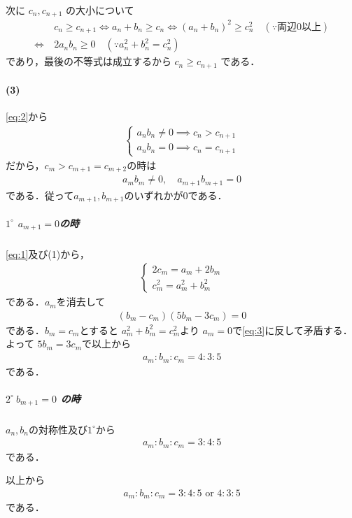 \documentclass[../../main.tex]{subfiles}
\begin{document}
次に $c_{n}, c_{n+1}$ の大小について
\begin{align}
  & c_n \ge c_{n+1}
  \Leftrightarrow
  a_n+b_n \ge c_n
  \Leftrightarrow
  (a_n+b_n)^2 \ge c_n^2 \quad (\because \text{両辺0以上}) \\
  \Leftrightarrow\
  & 2a_nb_n \ge 0 \quad (\because a_n^2+b_n^2=c_n^2) \label{eq:2}
\end{align}
であり，最後の不等式は成立するから $c_n \ge c_{n+1}$ である．

\paragraph{(3)}

\cref{eq:2}から
\begin{align}
  \begin{cases}
    a_nb_n \neq 0 \implies c_n > c_{n+1} \\
    a_nb_n = 0 \implies c_n = c_{n+1}
  \end{cases}
\end{align}
だから，$c_m>c_{m+1}=c_{m+2}$の時は
\begin{align}
  a_mb_m \neq 0, \quad a_{m+1}b_{m+1} = 0 \label{eq:3}
\end{align}
である．従って$a_{m+1}, b_{m+1}$のいずれかが$0$である．

\subparagraph{$1^{\circ}$ $a_{m+1}=0$の時}

\cref{eq:1}及び(1)から，
\begin{align}
  \begin{cases}
    2c_m = a_m+2b_m \\
    c_m^2 = a_m^2+b_m^2
  \end{cases}
\end{align}
である．$a_m$を消去して
\begin{align}
  (b_m-c_m)(5b_m-3c_m) = 0
\end{align}
である．$b_m=c_m$とすると $a_m^2+b_m^2=c_m^2$より $a_m=0$で\cref{eq:3}に反して矛盾する．よって $5b_m = 3c_m$で以上から
\begin{align}
  a_m:b_m:c_m = 4:3:5 \label{eq:4}
\end{align}
である．

\subparagraph{$2^\circ\ b_{m+1} = 0$ の時}

$a_n, b_n$の対称性及び$1^\circ$から
\begin{align}
  a_m:b_m:c_m = 3:4:5
\end{align}
である．
\casesend

以上から
\begin{align}
  a_m:b_m:c_m = 3:4:5 \text{ or } 4:3:5
\end{align}
である．
\end{document}
